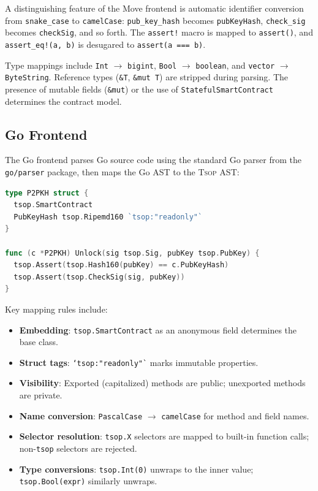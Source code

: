 \documentclass[11pt,a4paper]{article}
\newcommand{\tsop}{\textsc{Tsop}}
\newcommand{\bs}{\texttt{ByteString}}
\newcommand{\bigintty}{\texttt{bigint}}
\newcommand{\boolty}{\texttt{boolean}}
\begin{document}
A distinguishing feature of the Move frontend is automatic identifier
conversion from \texttt{snake\_case} to \texttt{camelCase}:
\texttt{pub\_key\_hash} becomes \texttt{pubKeyHash},
\texttt{check\_sig} becomes \texttt{checkSig}, and so forth. The
\texttt{assert!} macro is mapped to \texttt{assert()}, and
\texttt{assert\_eq!(a, b)} is desugared to \texttt{assert(a === b)}.

Type mappings include \texttt{Int} $\to$ \bigintty{},
\texttt{Bool} $\to$ \boolty{}, and \texttt{vector} $\to$ \bs{}.
Reference types (\texttt{\&T}, \texttt{\&mut T}) are stripped during parsing.
The presence of mutable fields (\texttt{\&mut}) or the use of
\texttt{StatefulSmartContract} determines the contract model.

\subsection{Go Frontend}
\label{sec:frontend-go}

The Go frontend parses Go source code using the standard Go parser from
the \texttt{go/parser} package, then maps the Go AST to the \tsop{} AST:

\begin{lstlisting}[style=tsop,language=Go,
  morekeywords={type,struct,func}]
type P2PKH struct {
  tsop.SmartContract
  PubKeyHash tsop.Ripemd160 `tsop:"readonly"`
}

func (c *P2PKH) Unlock(sig tsop.Sig, pubKey tsop.PubKey) {
  tsop.Assert(tsop.Hash160(pubKey) == c.PubKeyHash)
  tsop.Assert(tsop.CheckSig(sig, pubKey))
}
\end{lstlisting}

Key mapping rules include:

\begin{itemize}[nosep]
  \item \textbf{Embedding}: \texttt{tsop.SmartContract} as an anonymous
    field determines the base class.
  \item \textbf{Struct tags}: \texttt{`tsop:"readonly"`} marks immutable
    properties.
  \item \textbf{Visibility}: Exported (capitalized) methods are public;
    unexported methods are private.
  \item \textbf{Name conversion}: \texttt{PascalCase} $\to$
    \texttt{camelCase} for method and field names.
  \item \textbf{Selector resolution}: \texttt{tsop.X} selectors are mapped
    to built-in function calls; non-\texttt{tsop} selectors are rejected.
  \item \textbf{Type conversions}: \texttt{tsop.Int(0)} unwraps to the
    inner value; \texttt{tsop.Bool(expr)} similarly unwraps.
\end{itemize}
\end{document}
